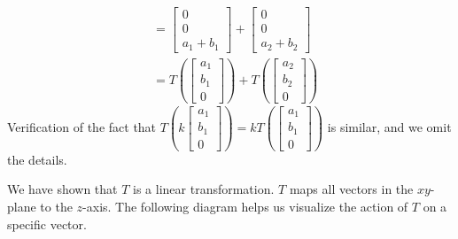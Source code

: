 \documentclass{ximera}
\begin{document}
\begin{example}
\begin{explanation}
\begin{align*}
&=\begin{bmatrix}0\\0\\a_1+b_1\end{bmatrix}+\begin{bmatrix}0\\0\\a_2+b_2\end{bmatrix}\\
&=T\left(\begin{bmatrix}a_1\\b_1\\0\end{bmatrix}\right)+ T\left(\begin{bmatrix}a_2\\b_2\\0\end{bmatrix}\right)
\end{align*}
Verification of the fact that $T\left(k\begin{bmatrix}a_1\\b_1\\0\end{bmatrix}\right)=kT\left(\begin{bmatrix}a_1\\b_1\\0\end{bmatrix}\right)$ is similar, and we omit the details.

We have shown that $T$ is a linear transformation.  $T$ maps all vectors in the $xy$-plane to the $z$-axis.  The following diagram helps us visualize the action of $T$ on a specific vector.

\begin{center}
\end{center}
\end{explanation}
\end{example}
\end{document}
